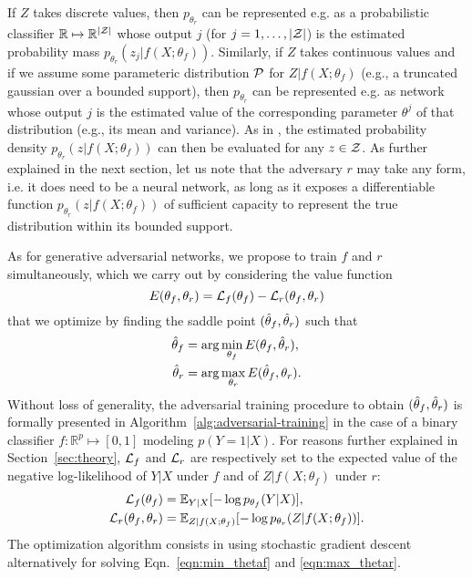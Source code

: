 \documentclass[twocolumn,superscriptaddress,aps]{revtex4-1}
\theoremstyle{plain}
\begin{document}
If $Z$ takes discrete values, then $p_{\theta_r}$ can be represented e.g. as a
probabilistic classifier $\mathbb{R} \mapsto \mathbb{R}^{|{\cal Z|}}$ whose
output $j$ (for $j=1, \dots, |{\cal Z}|$) is the estimated probability mass
$p_{\theta_r}(z_j|f(X;\theta_f))$. Similarly, if $Z$ takes continuous values and
if we assume some parameteric distribution ${\cal P}$ for $Z|f(X;\theta_f)$ (e.g., a
truncated gaussian over a bounded support), then $p_{\theta_r}$ can be
represented e.g. as network whose output $j$ is the estimated value of the
corresponding parameter $\theta^j$ of that distribution (e.g., its mean and variance). As
in \citep{nix1994estimating}, the estimated probability density
$p_{\theta_r}(z|f(X;\theta_f))$ can then be evaluated for any $z \in {\cal Z}$.
As further explained in the next section, let us note that the adversary $r$ may
take any form, i.e. it does need to be a neural network, as long as it exposes a
differentiable function $p_{\theta_r}(z|f(X;\theta_f))$ of sufficient capacity
to represent the true distribution within its bounded support.

As for generative adversarial networks, we propose to
train $f$ and $r$ simultaneously, which we carry out by considering
the value function
\begin{equation}
    E(\theta_f, \theta_r) = {\cal L}_f(\theta_f) - {\cal L}_r(\theta_f, \theta_r)
\end{equation}
that we optimize by finding the saddle point $(\smash{\hat\theta_f}, \smash{\hat\theta_r})$ such that
\begin{align}
    \smash{\hat\theta_f} &= \arg \min_{\theta_f} E(\theta_f, \smash{\hat\theta_r}), \label{eqn:min_thetaf} \\
    \smash{\hat\theta_r} &= \arg \max_{\theta_r} E(\smash{\hat\theta_f}, \theta_r) \label{eqn:max_thetar}.
\end{align}
Without loss of generality, the adversarial training procedure to obtain
$(\smash{\hat\theta_f}, \smash{\hat\theta_r})$ is formally presented in
Algorithm~\ref{alg:adversarial-training} in the case of a binary classifier $f :
\mathbb{R}^p \mapsto [0,1]$ modeling $p(Y=1|X)$. For reasons further explained
in Section~\ref{sec:theory}, ${\cal L}_f$ and ${\cal L}_r$  are respectively set to the
expected value of the
negative log-likelihood of $Y|X$ under $f$ and of $Z|f(X;\theta_f)$ under
$r$:
\begin{align}
    {\cal L}_f(\theta_f) &= \mathbb{E}_{Y|X} [ -\log p_{\theta_f} (Y|X) ], \\
    {\cal L}_r(\theta_f, \theta_r) &= \mathbb{E}_{Z|f(X;\theta_f)} [-\log p_{\theta_r} (Z|f(X;\theta_f))].
\end{align}
The optimization algorithm consists in using stochastic gradient descent
alternatively for solving Eqn.~\ref{eqn:min_thetaf} and \ref{eqn:max_thetar}.
\end{document}
